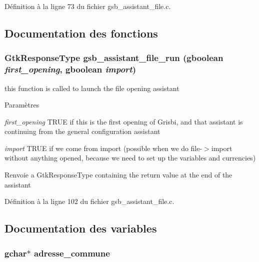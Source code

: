 Définition à la ligne 73 du fichier gsb\_\-assistant\_\-file.c.



\subsection{Documentation des fonctions}
\subsubsection[{gsb\_\-assistant\_\-file\_\-run}]{\setlength{\rightskip}{0pt plus 5cm}GtkResponseType gsb\_\-assistant\_\-file\_\-run (gboolean {\em first\_\-opening}, \/  gboolean {\em import})}\label{gsb__assistant__file_8c_aae9dc6c606124740c2518604c2b77685}
this function is called to launch the file opening assistant


\begin{DoxyParams}{Paramètres}
\item[{\em first\_\-opening}]TRUE if this is the first opening of Grisbi, and that assistant is continuing from the general configuration assistant \item[{\em import}]TRUE if we come from import (possible when we do file-\/$>$import without anything opened, because we need to set up the variables and currencies)\end{DoxyParams}
\begin{DoxyReturn}{Renvoie}
a GtkResponseType containing the return value at the end of the assistant 
\end{DoxyReturn}


Définition à la ligne 102 du fichier gsb\_\-assistant\_\-file.c.



\subsection{Documentation des variables}
\subsubsection[{adresse\_\-commune}]{\setlength{\rightskip}{0pt plus 5cm}gchar$\ast$ {\bf adresse\_\-commune}}\label{gsb__assistant__file_8c_ab7ec5b8a1b4dca10b71bfe0364eb7248}


